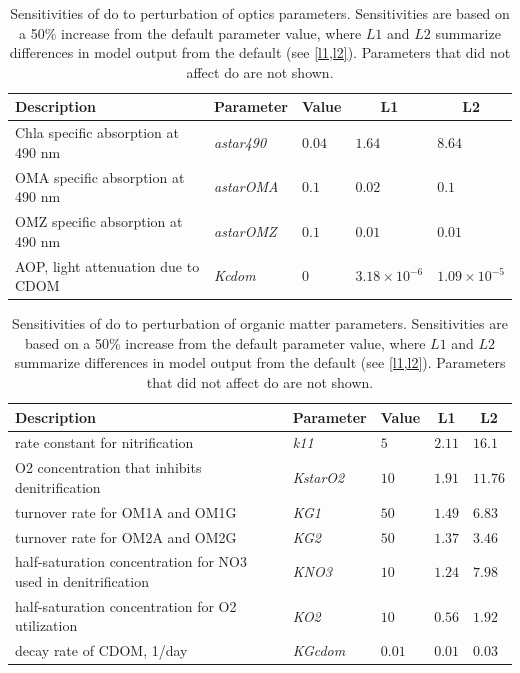 \documentclass[letterpaper,12pt,oneside]{article}\usepackage[]{graphicx}\usepackage[]{color}
\begin{document}

\begin{table}[!tbp]
{\normalsize
\caption{Sensitivities of \ac{do} to perturbation of optics parameters.  Sensitivities are based on a 50\% increase from the default parameter value, where $L1$ and $L2$ summarize differences in model output from the default (see \cref{l1,l2}).  Parameters that did not affect \ac{do} are not shown.\label{tab:optsens}} 
\begin{center}
\begin{tabular}{lllll}
\hline\hline
\multicolumn{1}{l}{Description}&\multicolumn{1}{c}{Parameter}&\multicolumn{1}{c}{Value}&\multicolumn{1}{c}{L1}&\multicolumn{1}{c}{L2}\tabularnewline
\hline
Chla specific absorption at 490 nm&\textit{astar490}&$0.04$&$1.64$&$8.64$\tabularnewline
OMA specific absorption at 490 nm&\textit{astarOMA}&$0.1$&$0.02$&$0.1$\tabularnewline
OMZ specific absorption at 490 nm&\textit{astarOMZ}&$0.1$&$0.01$&$0.01$\tabularnewline
AOP, light attenuation due to CDOM&\textit{Kcdom}&$0$&$3.18\times 10^{-6}$&$1.09\times 10^{-5}$\tabularnewline
\hline
\end{tabular}\end{center}}

\end{table}


\begin{table}[!tbp]
{\normalsize
\caption{Sensitivities of \ac{do} to perturbation of organic matter parameters.  Sensitivities are based on a 50\% increase from the default parameter value, where $L1$ and $L2$ summarize differences in model output from the default (see \cref{l1,l2}).  Parameters that did not affect \ac{do} are not shown.\label{tab:omsens}} 
\begin{center}
\begin{tabular}{lllll}
\hline\hline
\multicolumn{1}{l}{Description}&\multicolumn{1}{c}{Parameter}&\multicolumn{1}{c}{Value}&\multicolumn{1}{c}{L1}&\multicolumn{1}{c}{L2}\tabularnewline
\hline
rate constant for nitrification&\textit{k11}&$5$&$2.11$&$16.1$\tabularnewline
O2 concentration that inhibits denitrification&\textit{KstarO2}&$10$&$1.91$&$11.76$\tabularnewline
turnover rate for OM1A and OM1G&\textit{KG1}&$50$&$1.49$&$6.83$\tabularnewline
turnover rate for OM2A and OM2G&\textit{KG2}&$50$&$1.37$&$3.46$\tabularnewline
half-saturation concentration for NO3 used in denitrification&\textit{KNO3}&$10$&$1.24$&$7.98$\tabularnewline
half-saturation concentration for O2 utilization&\textit{KO2}&$10$&$0.56$&$1.92$\tabularnewline
decay rate of CDOM, 1/day&\textit{KGcdom}&$0.01$&$0.01$&$0.03$\tabularnewline
\hline
\end{tabular}\end{center}}

\end{table}
\end{document}
